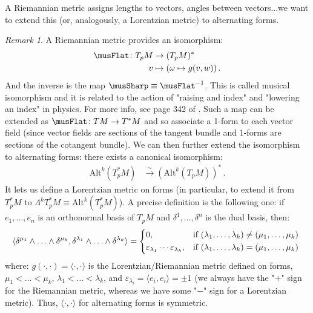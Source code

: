 \documentclass[a4paper,11pt,titlepage, article, oneside]{memoir}
\numberwithin{equation}{section}
\theoremstyle{definition}
\theoremstyle{remark}
\newtheorem{remark}[theorem]{Remark}
\begin{document}
A Riemannian metric assigns lengths to vectors, angles between vectors...we want to extend this (or, analogously, a Lorentzian metric) to alternating forms.
\newline
\begin{remarkbox}
 \begin{remark} \label{genmetricremark}
A Riemannian metric provides an isomorphism:
\begin{align*}
\musFlat \colon T_p M &\rightarrow (T_p M)^* \\
v &\mapsto (\omega \mapsto g(v, w)) \, .
\end{align*}
And the inverse is the map $\musSharp \equiv \musFlat^{-1}$. This is called musical isomorphism and it is related to the action of "raising and index" and "lowering an index" in physics. For more info, see page 342 of . Such a map can be extended as $\musFlat \colon TM \rightarrow T^*M$ and so associate a 1-form to each vector field (since vector fields are sections of the tangent bundle and 1-forms are sections of the cotangent bundle). We can then further extend the isomorphism to alternating forms:  there exists a canonical isomorphism:
\begin{align*}
\text{Alt}^k(T_p^*M) & \overset{\sim}{\longrightarrow} (\text{Alt}^k(T_p M))^* \, . 
\end{align*}
It lets us define a Lorentzian metric on forms (in particular, to extend it from $T_p^* M$ to $\Lambda^kT_p^* M \equiv \text{Alt}^k (T_p^* M)$). A precise definition is the following one: if $e_1, \ldots, e_n$ is an orthonormal basis of $T_pM$ and $\delta^1, \ldots, \delta^n$ is the dual basis, then:
\begin{equation*}
\langle \delta^{\mu_1} \wedge \ldots \wedge \delta^{\mu_k}, \delta^{\lambda_1}\wedge \ldots \wedge \delta^{\lambda_k} \rangle = \begin{cases*}
0, & if $(\lambda_1, \ldots, \lambda_k) \not = (\mu_1, \ldots, \mu_k)$\\
\varepsilon_{\lambda_1}\cdots \varepsilon_{\lambda_k}, &if $(\lambda_1, \ldots, \lambda_k) = (\mu_1, \ldots, \mu_k)$
\end{cases*}
\end{equation*}
where: $g(\cdot, \cdot) = \langle\cdot, \cdot\rangle$ is the Lorentzian/Riemannian metric defined on forms, $\mu_1 < \ldots < \mu_k$, $\lambda_1 < \ldots < \lambda_k$, and $\varepsilon_{\lambda_i}= \langle e_i, e_i \rangle = \pm1$ (we always have the "$+$" sign for the Riemannian metric, whereas we have some "$-$" sign for a Lorentzian metric). Thus, $\langle \cdot, \cdot \rangle$ for alternating forms is symmetric.
\end{remark} \end{remarkbox}
\end{document}
